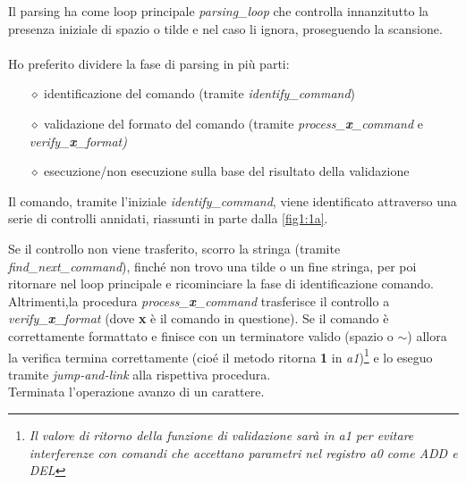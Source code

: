 \documentclass[11pt]{report}
\begin{document}
        Il parsing ha come loop principale \textit{parsing\_loop} che controlla innanzitutto la presenza iniziale di spazio o tilde e nel caso li ignora, proseguendo la scansione.
        \\\\Ho preferito dividere la fase di parsing in più parti:
        \begin{itemize}
            \item[$\diamond$] identificazione del comando (tramite \textit{identify\_command})
            \item[$\diamond$] validazione del formato del comando (tramite \textit{process\_\textbf{x}\_command} e \textit{verify\_\textbf{x}\_format)}
            \item[$\diamond$] esecuzione/non esecuzione sulla base del risultato della validazione
        \end{itemize}

        Il comando, tramite l'iniziale \textit{identify\_command}, viene identificato attraverso una serie di controlli annidati, riassunti in parte dalla \ref{fig1:1a}.
        \begin{figure}[H]
            \centering

            \hfill
            \label{fig1}
            \caption[]{}
        \end{figure}
        
       Se il controllo non viene trasferito, scorro la stringa (tramite \textit{find\_next\_command}), finché non trovo una tilde o un fine stringa, per poi ritornare nel loop principale e ricominciare la fase di identificazione comando. \\
       Altrimenti,la procedura \textit{process\_\textbf{x}\_command} trasferisce il controllo a \textit{verify\_\textbf{x}\_format} (dove \textbf{x} è il comando in questione).
       Se il comando è correttamente formattato e finisce con un terminatore valido (spazio o $\sim$) allora la verifica termina correttamente (cioé il metodo ritorna \textbf{1} in  \textit{a1})\footnote[1]{\textit{Il valore di ritorno della funzione di validazione sarà in a1 per evitare interferenze con comandi che accettano parametri nel registro \textit{a0} come ADD e DEL}} e lo eseguo tramite \textit{jump-and-link} alla rispettiva procedura.\\ Terminata l'operazione avanzo di un carattere.
\end{document}

